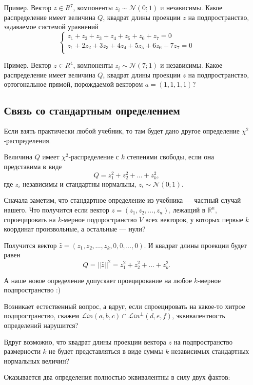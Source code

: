 \documentclass[11pt,russian,]{article}
\newcommand{\cN}{\mathcal{N}}
\newcommand{\RR}{\mathbb{R}}
\renewcommand{\Rn}{\RR^n}
\newcommand{\1}{\mathbbm{1}}
\newcommand{\Lin}{\mathcal{L}in}
\newcommand{\Linp}{\Lin^{\perp}}
\begin{document}
Пример. Вектор \(z \in R^7\), компоненты \(z_i \sim \cN(0;1)\) и
независимы. Какое распределение имеет величина \(Q\), квадрат длины
проекции \(z\) на подпространство, задаваемое системой уравнений \[
\begin{cases}
z_1 + z_2 + z_3 +z_4 + z_5 +z_6 + z_7 = 0 \\
z_1 + 2z_2 +3z_3 +4z_4 +5z_5+6z_6+7z_7 =0 \\
\end{cases}
\]

Пример. Вектор \(z \in R^4\), компоненты \(z_i \sim \cN(7;1)\) и
независимы. Какое распределение имеет величина \(Q\), квадрат длины
проекции \(z\) на подпространство, ортогональное прямой, порождаемой
вектором \(a=(1, 1, 1, 1)\)?

\subsection{Связь со стандартным определением}\label{---}

Если взять практически любой учебник, то там будет дано другое
определение \(\chi^2\)-распределения.

Величина \(Q\) имеет \(\chi^2\)-распределение с \(k\) степенями свободы,
если она представима в виде \[
Q = z_1^2 + z_2^2 + \ldots + z_k^2,
\] где \(z_i\) независимы и стандартны нормальны, \(z_i \sim \cN(0;1)\).

Сначала заметим, что стандартное определение из учебника --- частный
случай нашего. Что получится если вектор
\(z = (z_1, z_2, \ldots, z_n)\), лежащий в \(\Rn\), спроецировать на
\(k\)-мерное подпространство \(V\) всех векторов, у которых первые \(k\)
координат произвольные, а остальные --- нули?

Получится вектор \(\hat z = (z_1, z_2, \ldots, z_k, 0, 0, \ldots, 0)\).
И квадрат длины проекции будет равен \[
Q = ||\hat z||^2 = z_1^2 + z_2^2 + \ldots + z_k^2.
\]

А наше новое определение допускает проецирование на любое \(k\)-мерное
подпространство :)

Возникает естественный вопрос, а вдруг, если спроецировать на какое-то
хитрое подпространство, скажем \(\Lin(a, b, c) \cap \Linp (d, e, f)\),
эквивалентность определений нарушится?

Вдруг возможно, что квадрат длины проекции вектора \(z\) на
подпространство размерности \(k\) не будет представляться в виде суммы
\(k\) независимых стандартных нормальных величин?

Оказывается два определения полностью эквивалентны в силу двух фактов:
\end{document}
